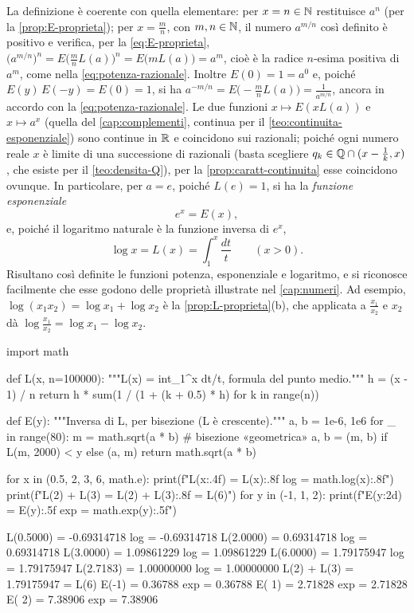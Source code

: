 La definizione è coerente con quella elementare: per $x=n\in\mathbb{N}$ restituisce $a^{n}$ (per la
\cref{prop:E-proprieta}); per $x=\frac mn$, con $m,n\in\mathbb{N}$, il numero $a^{m/n}$ così definito è
positivo e verifica, per la \eqref{eq:E-proprieta},
$\bigl(a^{m/n}\bigr)^{n}=E\bigl(\frac mnL(a)\bigr)^{n}=E\bigl(mL(a)\bigr)=a^{m}$, cioè è la radice $n$-esima
positiva di $a^{m}$, come nella \eqref{eq:potenza-razionale}. Inoltre $E(0)=1=a^{0}$ e,
poiché $E(y)\,E(-y)=E(0)=1$, si ha $a^{-m/n}=E\bigl(-\frac mnL(a)\bigr)=\frac1{a^{m/n}}$, ancora in
accordo con la \eqref{eq:potenza-razionale}. Le due funzioni $x\mapsto E(xL(a))$ e $x\mapsto a^{x}$
(quella del \cref{cap:complementi}, continua per il \cref{teo:continuita-esponenziale})
sono continue in $\mathbb{R}$ e coincidono sui razionali; poiché ogni numero reale $x$ è limite di
una successione di razionali (basta scegliere $q_{k}\in\mathbb{Q}\cap(x-\frac1k,x)$, che esiste per il
\cref{teo:densita-Q}), per la \cref{prop:caratt-continuita} esse coincidono ovunque. In particolare, per $a=e$,
poiché $L(e)=1$, si ha la \emph{funzione esponenziale}
\begin{equation}\label{eq:esponenziale-integrale}
  e^{x}=E(x) ,
\end{equation}
e, poiché il logaritmo naturale è la funzione inversa di $e^{x}$,
\begin{equation}\label{eq:logaritmo-integrale}
  \log x=L(x)=\int_{1}^{x}\frac{dt}t \qquad (x>0) .
\end{equation}
Risultano così definite le funzioni potenza, esponenziale e logaritmo, e si riconosce
facilmente che esse godono delle proprietà illustrate nel \cref{cap:numeri}. Ad esempio,
$\log(x_{1}x_{2})=\log x_{1}+\log x_{2}$ è la \cref{prop:L-proprieta}(b), che applicata a
$\frac{x_{1}}{x_{2}}$ e $x_{2}$ dà $\log\frac{x_{1}}{x_{2}}=\log x_{1}-\log x_{2}$.

\begin{python}
import math

def L(x, n=100000):
    """L(x) = int_1^x dt/t, formula del punto medio."""
    h = (x - 1) / n
    return h * sum(1 / (1 + (k + 0.5) * h) for k in range(n))

def E(y):
    """Inversa di L, per bisezione (L è crescente)."""
    a, b = 1e-6, 1e6
    for _ in range(80):
        m = math.sqrt(a * b)            # bisezione «geometrica»
        a, b = (m, b) if L(m, 2000) < y else (a, m)
    return math.sqrt(a * b)

for x in (0.5, 2, 3, 6, math.e):
    print(f"L({x:.4f}) = {L(x):.8f}   log = {math.log(x):.8f}")
print(f"L(2) + L(3) = {L(2) + L(3):.8f} = L(6)")
for y in (-1, 1, 2):
    print(f"E({y:2d}) = {E(y):.5f}   exp = {math.exp(y):.5f}")
\end{python}
\begin{risultato}
L(0.5000) = -0.69314718   log = -0.69314718
L(2.0000) = 0.69314718   log = 0.69314718
L(3.0000) = 1.09861229   log = 1.09861229
L(6.0000) = 1.79175947   log = 1.79175947
L(2.7183) = 1.00000000   log = 1.00000000
L(2) + L(3) = 1.79175947 = L(6)
E(-1) = 0.36788   exp = 0.36788
E( 1) = 2.71828   exp = 2.71828
E( 2) = 7.38906   exp = 7.38906
\end{risultato}

